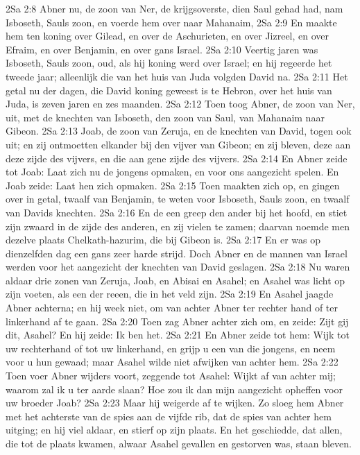 2Sa 2:8  Abner nu, de zoon van Ner, de krijgsoverste, dien Saul gehad had, nam Isboseth, Sauls zoon, en voerde hem over naar Mahanaim,
2Sa 2:9  En maakte hem ten koning over Gilead, en over de Aschurieten, en over Jizreel, en over Efraim, en over Benjamin, en over gans Israel.
2Sa 2:10  Veertig jaren was Isboseth, Sauls zoon, oud, als hij koning werd over Israel; en hij regeerde het tweede jaar; alleenlijk die van het huis van Juda volgden David na.
2Sa 2:11  Het getal nu der dagen, die David koning geweest is te Hebron, over het huis van Juda, is zeven jaren en zes maanden.
2Sa 2:12  Toen toog Abner, de zoon van Ner, uit, met de knechten van Isboseth, den zoon van Saul, van Mahanaim naar Gibeon.
2Sa 2:13  Joab, de zoon van Zeruja, en de knechten van David, togen ook uit; en zij ontmoetten elkander bij den vijver van Gibeon; en zij bleven, deze aan deze zijde des vijvers, en die aan gene zijde des vijvers.
2Sa 2:14  En Abner zeide tot Joab: Laat zich nu de jongens opmaken, en voor ons aangezicht spelen. En Joab zeide: Laat hen zich opmaken.
2Sa 2:15  Toen maakten zich op, en gingen over in getal, twaalf van Benjamin, te weten voor Isboseth, Sauls zoon, en twaalf van Davids knechten.
2Sa 2:16  En de een greep den ander bij het hoofd, en stiet zijn zwaard in de zijde des anderen, en zij vielen te zamen; daarvan noemde men dezelve plaats Chelkath-hazurim, die bij Gibeon is.
2Sa 2:17  En er was op dienzelfden dag een gans zeer harde strijd. Doch Abner en de mannen van Israel werden voor het aangezicht der knechten van David geslagen.
2Sa 2:18  Nu waren aldaar drie zonen van Zeruja, Joab, en Abisai en Asahel; en Asahel was licht op zijn voeten, als een der reeen, die in het veld zijn.
2Sa 2:19  En Asahel jaagde Abner achterna; en hij week niet, om van achter Abner ter rechter hand of ter linkerhand af te gaan.
2Sa 2:20  Toen zag Abner achter zich om, en zeide: Zijt gij dit, Asahel? En hij zeide: Ik ben het.
2Sa 2:21  En Abner zeide tot hem: Wijk tot uw rechterhand of tot uw linkerhand, en grijp u een van die jongens, en neem voor u hun gewaad; maar Asahel wilde niet afwijken van achter hem.
2Sa 2:22  Toen voer Abner wijders voort, zeggende tot Asahel: Wijkt af van achter mij; waarom zal ik u ter aarde slaan? Hoe zou ik dan mijn aangezicht opheffen voor uw broeder Joab?
2Sa 2:23  Maar hij weigerde af te wijken. Zo sloeg hem Abner met het achterste van de spies aan de vijfde rib, dat de spies van achter hem uitging; en hij viel aldaar, en stierf op zijn plaats. En het geschiedde, dat allen, die tot de plaats kwamen, alwaar Asahel gevallen en gestorven was, staan bleven.
